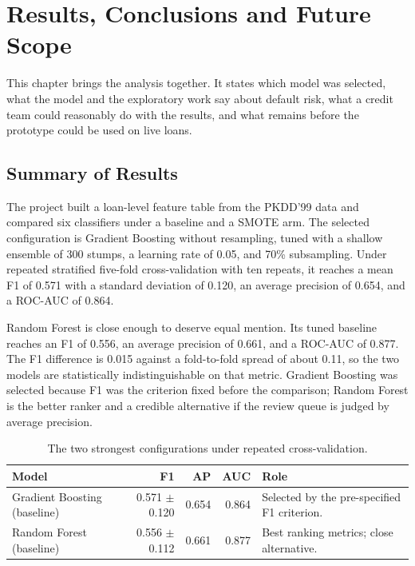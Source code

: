 \chapter{Results, Conclusions and Future Scope}
\label{ch:conclusion}

This chapter brings the analysis together. It states which model was selected, what the model and the exploratory work say about default risk, what a credit team could reasonably do with the results, and what remains before the prototype could be used on live loans.

\section{Summary of Results}
\label{sec:results-summary}

The project built a loan-level feature table from the PKDD'99 data and compared six classifiers under a baseline and a SMOTE arm. The selected configuration is Gradient Boosting without resampling, tuned with a shallow ensemble of 300 stumps, a learning rate of 0.05, and 70\% subsampling. Under repeated stratified five-fold cross-validation with ten repeats, it reaches a mean F1 of 0.571 with a standard deviation of 0.120, an average precision of 0.654, and a ROC-AUC of 0.864.

Random Forest is close enough to deserve equal mention. Its tuned baseline reaches an F1 of 0.556, an average precision of 0.661, and a ROC-AUC of 0.877. The F1 difference is 0.015 against a fold-to-fold spread of about 0.11, so the two models are statistically indistinguishable on that metric. Gradient Boosting was selected because F1 was the criterion fixed before the comparison; Random Forest is the better ranker and a credible alternative if the review queue is judged by average precision.

\begin{table}[H]
    \centering
    \caption{The two strongest configurations under repeated cross-validation.}
    \label{tab:final-models}
    \begin{tabular}{@{}lrrrl@{}}
        \toprule
        \textbf{Model} & \textbf{F1} & \textbf{AP} & \textbf{AUC} & \textbf{Role} \\
        \midrule
        Gradient Boosting (baseline) & 0.571 $\pm$ 0.120 & 0.654 & 0.864 & Selected by the pre-specified F1 criterion. \\
        Random Forest (baseline) & 0.556 $\pm$ 0.112 & 0.661 & 0.877 & Best ranking metrics; close alternative. \\
        \bottomrule
    \end{tabular}
\end{table}

